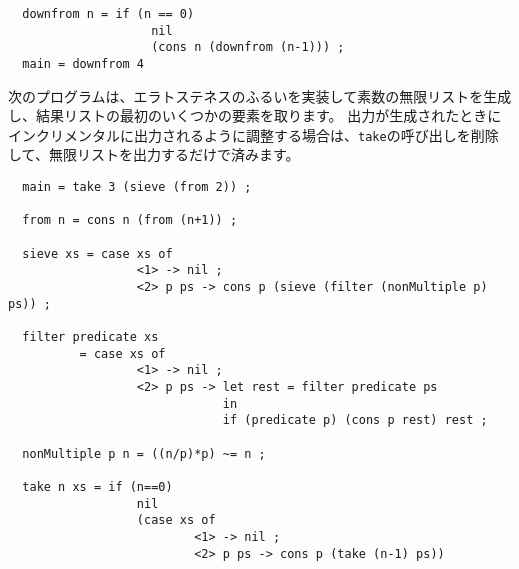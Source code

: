 \documentclass{jarticle}
\begin{document}
\begin{verbatim}
  downfrom n = if (n == 0)
                    nil
                    (cons n (downfrom (n-1))) ;
  main = downfrom 4
\end{verbatim}

次のプログラムは、エラトステネスのふるいを実装して素数の無限リストを生成し、結果リストの最初のいくつかの要素を取ります。
出力が生成されたときにインクリメンタルに出力されるように調整する場合は、\texttt{take}の呼び出しを削除して、無限リストを出力するだけで済みます。

\begin{verbatim}
  main = take 3 (sieve (from 2)) ;

  from n = cons n (from (n+1)) ;

  sieve xs = case xs of
                  <1> -> nil ;
                  <2> p ps -> cons p (sieve (filter (nonMultiple p) ps)) ;

  filter predicate xs
          = case xs of
                  <1> -> nil ;
                  <2> p ps -> let rest = filter predicate ps
                              in
                              if (predicate p) (cons p rest) rest ;

  nonMultiple p n = ((n/p)*p) ~= n ;

  take n xs = if (n==0)
                  nil
                  (case xs of
                          <1> -> nil ;
                          <2> p ps -> cons p (take (n-1) ps))
\end{verbatim}
\end{document}
